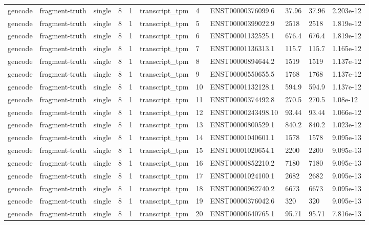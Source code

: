 \begin{tabular}{lllllllllll}
gencode & fragment-truth & single & 8 & 1 & transcript\_tpm & 4 & ENST00000376099.6 & 37.96 & 37.96 & 2.203e-12 \\
gencode & fragment-truth & single & 8 & 1 & transcript\_tpm & 5 & ENST00000399022.9 & 2518 & 2518 & 1.819e-12 \\
gencode & fragment-truth & single & 8 & 1 & transcript\_tpm & 6 & ENST00001132525.1 & 676.4 & 676.4 & 1.819e-12 \\
gencode & fragment-truth & single & 8 & 1 & transcript\_tpm & 7 & ENST00001136313.1 & 115.7 & 115.7 & 1.165e-12 \\
gencode & fragment-truth & single & 8 & 1 & transcript\_tpm & 8 & ENST00000894644.2 & 1519 & 1519 & 1.137e-12 \\
gencode & fragment-truth & single & 8 & 1 & transcript\_tpm & 9 & ENST00000550655.5 & 1768 & 1768 & 1.137e-12 \\
gencode & fragment-truth & single & 8 & 1 & transcript\_tpm & 10 & ENST00001132128.1 & 594.9 & 594.9 & 1.137e-12 \\
gencode & fragment-truth & single & 8 & 1 & transcript\_tpm & 11 & ENST00000374492.8 & 270.5 & 270.5 & 1.08e-12 \\
gencode & fragment-truth & single & 8 & 1 & transcript\_tpm & 12 & ENST00000243498.10 & 93.44 & 93.44 & 1.066e-12 \\
gencode & fragment-truth & single & 8 & 1 & transcript\_tpm & 13 & ENST00000800529.1 & 840.2 & 840.2 & 1.023e-12 \\
gencode & fragment-truth & single & 8 & 1 & transcript\_tpm & 14 & ENST00001040601.1 & 1578 & 1578 & 9.095e-13 \\
gencode & fragment-truth & single & 8 & 1 & transcript\_tpm & 15 & ENST00001020654.1 & 2200 & 2200 & 9.095e-13 \\
gencode & fragment-truth & single & 8 & 1 & transcript\_tpm & 16 & ENST00000852210.2 & 7180 & 7180 & 9.095e-13 \\
gencode & fragment-truth & single & 8 & 1 & transcript\_tpm & 17 & ENST00001024100.1 & 2682 & 2682 & 9.095e-13 \\
gencode & fragment-truth & single & 8 & 1 & transcript\_tpm & 18 & ENST00000962740.2 & 6673 & 6673 & 9.095e-13 \\
gencode & fragment-truth & single & 8 & 1 & transcript\_tpm & 19 & ENST00000376042.6 & 320 & 320 & 9.095e-13 \\
gencode & fragment-truth & single & 8 & 1 & transcript\_tpm & 20 & ENST00000640765.1 & 95.71 & 95.71 & 7.816e-13 \\

\end{tabular}

